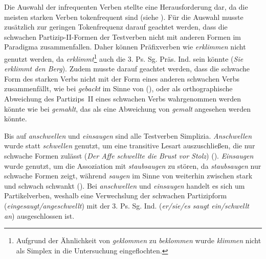 Die Auswahl der infrequenten Verben stellte eine Herausforderung dar, da die meisten starken Verben tokenfrequent sind (siehe ). Für die Auswahl musste zusätzlich zur geringen Tokenfrequenz darauf geachtet werden, dass die schwachen Partizip-II-Formen der Testverben nicht mit anderen Formen im Paradigma zusammenfallen. Daher können Präfixverben wie \textit{erklimmen} nicht genutzt werden, da \textit{erklimmt}{\footnote{Aufgrund der Ähnlichkeit von \textit{geklommen} zu \textit{beklommen} wurde \textit{klimmen} nicht als Simplex in die Untersuchung eingeflochten.}} auch die 3. Ps. Sg. Präs. Ind. sein könnte (\textit{Sie erklimmt den Berg}). Zudem musste darauf geachtet werden, dass die schwache Form des starken Verbs nicht mit der Form eines anderen schwachen Verbs zusammenfällt, wie bei \textit{gebackt} im Sinne von  (\cite{Duden.2020}), oder als orthographische Abweichung des Partizips~II eines schwachen Verbs wahrgenommen werden könnte wie bei \textit{gemahlt}, das als eine Abweichung von \textit{gemalt} angesehen werden könnte.

 
Bis auf \textit{anschwellen} und \textit{einsaugen} sind alle Testverben Simplizia. \textit{Anschwellen} wurde statt \textit{schwellen} genutzt, um eine transitive Lesart auszuschließen, die nur schwache Formen zulässt (\textit{Der Affe schwellte die Brust vor Stolz}) (\cite{Duden.2020}). \textit{Einsaugen} wurde genutzt, um die Assoziation mit \textit{staubsaugen} zu stören, da \textit{staubsaugen} nur schwache Formen zeigt, während \textit{saugen} im Sinne von  weiterhin zwischen stark und schwach schwankt (\cite[316]{Nowak.2011}). Bei \textit{anschwellen} und \textit{einsaugen} handelt es sich um Partikelverben, weshalb eine Verwechslung der schwachen Partizipform (\textit{eingesaugt/angeschwellt}) mit der 3. Ps. Sg. Ind. (\textit{er/sie/es saugt ein/schwellt an}) ausgeschlossen ist.

